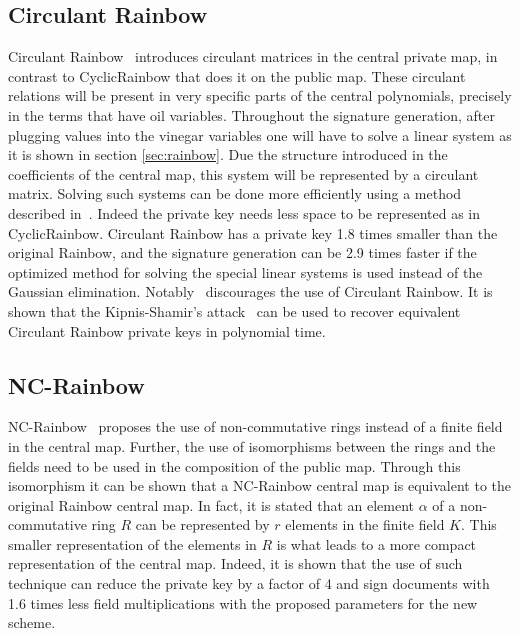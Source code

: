 \documentclass{ufsctex/ufsctex}
\begin{document}


\subsection{Circulant Rainbow}

Circulant Rainbow~\cite{peng2017circulant} introduces circulant matrices in the
central private map, in contrast to CyclicRainbow that does it on the public
map. These circulant relations will be present in very specific parts of the
central polynomials, precisely in the terms that have oil variables. Throughout
the signature generation, after plugging values into the vinegar variables one
will have to solve a linear system as it is shown in section \ref{sec:rainbow}.
Due the structure introduced in the coefficients of the central map, this
system will be represented by a circulant matrix. Solving such systems can be
done more efficiently using a method described in~\cite{peng2017circulant}.
Indeed the private key needs less space to be represented as in CyclicRainbow.
Circulant Rainbow has a private key 1.8 times smaller than the original
Rainbow, and the signature generation can be 2.9 times faster if the optimized
method for solving the special linear systems is used instead of the Gaussian
elimination. Notably~\cite{hashimoto2018security} discourages the use of
Circulant Rainbow. It is shown that the Kipnis-Shamir's
attack~\cite{kipnis1998cryptanalysis} can be used to recover equivalent
Circulant Rainbow private keys in polynomial time.

\subsection{NC-Rainbow}

NC-Rainbow~\cite{yasuda2012reducing} proposes the use of non-commutative rings
instead of a finite field in the central map. Further, the use of isomorphisms
between the rings and the fields need to be used in the composition of the
public map. Through this isomorphism it can be shown that a NC-Rainbow central
map is equivalent to the original Rainbow central map. In fact, it is stated
that an element $\alpha$ of a non-commutative ring $R$ can be represented by
$r$ elements in the finite field $K$. This smaller representation of the
elements in $R$ is what leads to a more compact representation of the central
map. Indeed, it is shown that the use of such technique can reduce the private
key by a factor of 4 and sign documents with 1.6 times less field
multiplications with the proposed parameters for the new scheme.
\end{document}
